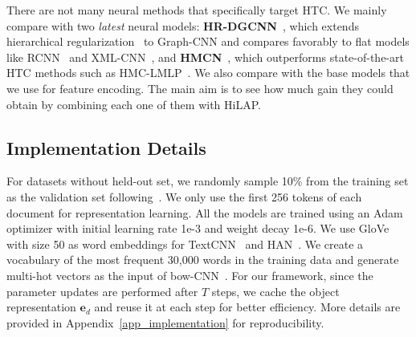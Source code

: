 \documentclass[11pt,a4paper]{article}
\newcommand{\start}[1]{\vspace{1.8mm}\noindent{{\bf #1}}}
\begin{document}
\start{2. Neural HTC Methods.}
There are not many neural methods that specifically target HTC. 
We mainly compare with two \textit{latest} neural models: \textbf{HR-DGCNN}~\citep{peng2018large}, which extends hierarchical regularization~\citep{gopal2013recursive} to Graph-CNN and compares favorably to flat models like RCNN~\cite{lai2015recurrent} and XML-CNN~\cite{liu2017deep}, and \textbf{HMCN}~\citep{wehrmann2018hierarchical}, which outperforms state-of-the-art HTC methods such as HMC-LMLP~\cite{cerri2016reduction}.
We also compare with the base models that we use for feature encoding.
The main aim is to see how much gain they could obtain by combining each one of them with HiLAP.


\subsection{Implementation Details}
For datasets without held-out set, we randomly sample 10\% from the training set as the validation set following~\citet{johnson2014effective,peng2018large}.
We only use the first 256 tokens of each document for representation learning.
All the models are trained using an Adam optimizer with initial learning rate 1e-3 and weight decay 1e-6.
We use GloVe~\citep{pennington2014glove} with size 50 as word embeddings for TextCNN~\cite{kim2014convolutional} and HAN~\cite{yang2016hierarchical}.
We create a vocabulary of the most frequent 30,000 words in the training data and generate multi-hot vectors as the input of bow-CNN~\cite{johnson2014effective}.
For our framework, since the parameter updates are performed after $T$ steps, we cache the object representation $\textbf{e}_d$ and reuse it at each step for better efficiency.
More details are provided in Appendix~\ref{app_implementation} for reproducibility.
\end{document}
